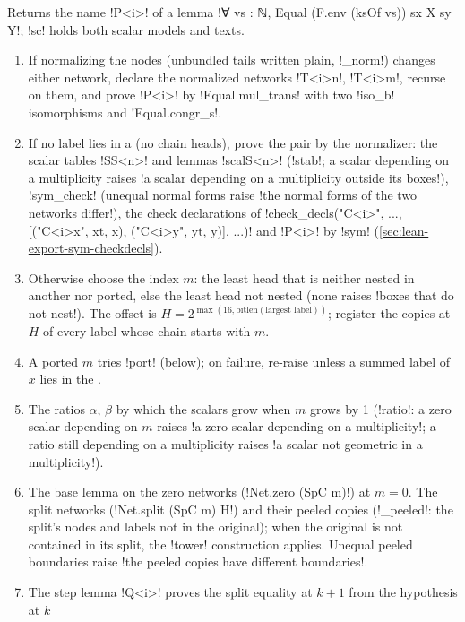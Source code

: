 {{{\begin{algorithm}\label{alg:lean-export-sym-fam}
Returns the name \lexlean!P<i>! of a lemma
\lexlean!∀ vs : ℕ, Equal (F.env (ksOf vs)) sx X sy Y!; \lexcode!sc! holds both scalar models and texts.
\begin{enumerate}
\item If normalizing the nodes (unbundled tails written plain, \lexpy!_norm!) changes either
network, declare the normalized networks \lexlean!T<i>n!, \lexlean!T<i>m!, recurse on them, and prove
\lexlean!P<i>! by \lexlean!Equal.mul_trans! with two \lexlean!iso_b! isomorphisms and \lexlean!Equal.congr_s!.
\item If no label lies in a \bbox (no chain heads), prove the pair by the normalizer: the
scalar tables \lexlean!SS<n>! and lemmas \lexlean!scalS<n>! (\lexpy!stab!; a scalar depending on a
multiplicity raises \lexcode!a scalar depending on a multiplicity outside its boxes!),
\lexpy!sym_check! (unequal normal forms raise \lexcode!the normal forms of the two networks differ!),
the check declarations of \lexpy!check_decls("C<i>", ..., [("C<i>x", xt, x), ("C<i>y", yt, y)], ...)!
and \lexlean!P<i>! by \lexpy!sym! (\cref{sec:lean-export-sym-checkdecls}).
\item Otherwise choose the \bbox index $m$: the least head that is neither nested in another
nor ported, else the least head not nested (none raises \lexcode!boxes that do not nest!). The
offset is $H = 2^{\max(16, \mathrm{bitlen}(\text{largest label}))}$; register the copies at
$H$ of every label whose chain starts with $m$.
\item A ported $m$ tries \lexpy!port! (below); on failure, re-raise unless a summed label of $x$
lies in the \bbox.
\item The ratios $\alpha$, $\beta$ by which the scalars grow when $m$ grows by 1 (\lexpy!ratio!: a
zero scalar depending on $m$ raises \lexcode!a zero scalar depending on a multiplicity!; a ratio
still depending on a multiplicity raises \lexcode!a scalar not geometric in a multiplicity!).
\item The base lemma on the zero networks (\lexlean!Net.zero (SpC m)!) at $m=0$. The split networks
(\lexlean!Net.split (SpC m) H!) and their peeled copies (\lexpy!_peeled!: the split's nodes and
labels not in the original); when the original is not contained in its split, the
\lexpy!tower! construction applies. Unequal peeled boundaries raise
\lexcode!the peeled copies have different boundaries!.
\item The step lemma \lexlean!Q<i>! proves the split equality at $k+1$ from the hypothesis at $k$

\end{enumerate}
\end{algorithm}}}}
